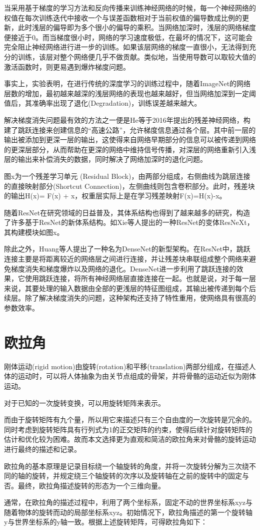 当采用基于梯度的学习方法和反向传播来训练神经网络的时候，每一个神经网络的权值在每次训练迭代中接收一个与误差函数相对于当前权值的偏导数成比例的更新，此时浅层的偏导即为多个很小的偏导的乘积。当网络加深时，浅层的网络梯度便接近于0。而当梯度很小时，网络的学习速度极低，在最坏的情况下，这可能会完全阻止神经网络进行进一步的训练。如果该层网络的梯度一直很小，无法得到充分的训练，该层对整个网络便几乎不做贡献。类似地，当使用导数可以取较大值的激活函数时，则更易遇到爆炸梯度问题。

事实上，实验表明，在进行传统的深度学习的训练过程中，随着ImageNet的网络层数的增加，最初越来越深的浅层网络的表现也越来越好，但当网络加深到一定阈值后，其准确率出现了退化(Degradation)，训练误差越来越大。

解决梯度消失问题最有效的方法之一便是He等于2016年提出的残差神经网络，构建了跳跃连接来创建信息的“高速公路”，允许梯度信息通过各个层。其中前一层的输出被添加到更深一层的输出，这使得来自网络早期部分的信息可以被传递到网络的更深层部分，从而帮助在更深的网络中维持信号传播，对深层的网络重新引入浅层的输出来补偿消失的数据，同时解决了网络加深时的退化问题。

图x为一个残差学习单元 (Residual Block)，由两部分组成，右侧曲线为跳层连接的直接映射部分(Shortcut Connection)，左侧曲线则包含卷积部分。此时，残差块的输出H(x)= F(x) + x，权重层实际上是在学习残差映射F(x)=H(x)-x。

随着ResNet在研究领域的日益普及，其体系结构也得到了越来越多的研究，构造了许多基于ResNet的新体系结构。如Xie等人提出的一种ResNet的变体ResNeXt，其构建模块如图x。

除此之外，Huang等人提出了一种名为DenseNet的新型架构。在ResNet中，跳跃连接主要是将距离较近的网络层之间进行连接，并让残差块串联组成整个网络来避免梯度消失和梯度爆炸以及网络的退化。DenseNet进一步利用了跳跃连接的效果，它使用跳跃连接，将所有神经网络层直接连接在一起。也就是说，对于每一层来说，其要处理的输入数据由全部的更浅层的特征图组成，其输出被传递到每个后续层。除了解决梯度消失的问题，这种架构还支持了特性重用，使网络具有很高的参数效率。



\section{欧拉角}
\esection{}
刚体运动(rigid motion)由旋转(rotation)和平移(translation)两部分组成，在描述人体的运动时，可以将人体抽象为由关节点组成的骨架，并将骨骼的运动近似为刚体运动。

对于已知的一次旋转变换，可以用旋转矩阵来表示。

而由于旋转矩阵有九个量，所以用它来描述只有三个自由度的一次旋转是冗余的。同时考虑到旋转矩阵具有行列式为1的正交矩阵的约束，使得后续针对旋转矩阵的估计和优化较为困难。故而本文选择更为直观和简洁的欧拉角来对骨骼的旋转运动进行最终的描述和记录。

欧拉角的基本原理是记录目标绕一个轴旋转的角度，并将一次旋转分解为三次绕不同的轴的旋转，并规定绕三个轴旋转的次序以及旋转轴在之前的旋转中的固定与否。最终，欧拉角描述旋转的形态为一个三维向量。

通常，在欧拉角的描述过程中，利用了两个坐标系，固定不动的世界坐标系xyz与随着物体的旋转而动的局部坐标系xyz。初始情况下，欧拉角描述的第一个旋转轴y与世界坐标系的y轴一致。根据上述旋转矩阵，可得欧拉角如下：

